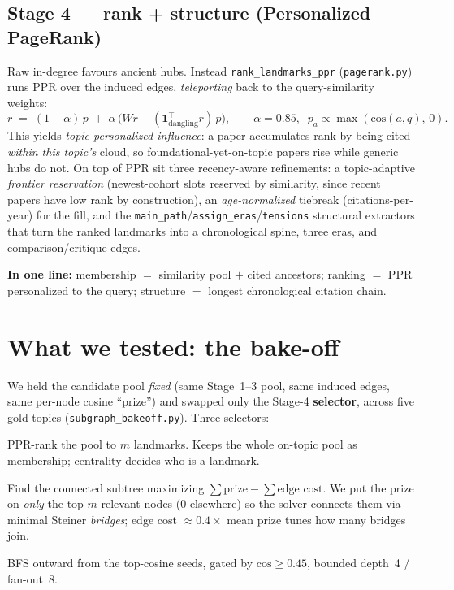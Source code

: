 \documentclass[11pt]{article}
\newcommand{\code}[1]{\texttt{\small #1}}
\newcommand{\arxiv}[1]{\href{https://arxiv.org/abs/#1}{\texttt{#1}}}
\begin{document}
\subsection*{Stage 4 --- rank + structure (Personalized PageRank)}
Raw in-degree favours ancient hubs. Instead \code{rank\_landmarks\_ppr}
(\code{pagerank.py}) runs PPR over the induced edges, \emph{teleporting} back to the
query-similarity weights:
\[
  r \;=\; (1-\alpha)\,p \;+\; \alpha\,\big(W r + (\mathbf{1}^\top_{\text{dangling}} r)\,p\big),
  \qquad \alpha = 0.85,\;\; p_a \propto \max(\text{cos}(a, q),\,0).
\]
This yields \emph{topic-personalized influence}: a paper accumulates rank by being cited
\emph{within this topic's} cloud, so foundational-yet-on-topic papers rise while generic hubs do
not. On top of PPR sit three recency-aware refinements: a topic-adaptive \emph{frontier
reservation} (newest-cohort slots reserved by similarity, since recent papers have low rank by
construction), an \emph{age-normalized} tiebreak (citations-per-year) for the fill, and the
\code{main\_path}/\code{assign\_eras}/\code{tensions} structural extractors that turn the ranked
landmarks into a chronological spine, three eras, and comparison/critique edges.

\medskip\noindent\textbf{In one line:} membership $=$ similarity pool $+$ cited ancestors;
ranking $=$ PPR personalized to the query; structure $=$ longest chronological citation chain.

\section{What we tested: the bake-off}

We held the candidate pool \emph{fixed} (same Stage~1--3 pool, same induced edges, same per-node
cosine ``prize'') and swapped only the Stage-4 \textbf{selector}, across five gold topics
(\code{subgraph\_bakeoff.py}). Three selectors:

\begin{description}[leftmargin=0pt,itemsep=3pt]
  \item[\code{induce} (ours).] PPR-rank the pool to $m$ landmarks. Keeps the whole on-topic pool as
  membership; centrality decides who is a landmark.
  \item[\code{pcst} --- Prize-Collecting Steiner Tree (G-Retriever, \arxiv{2402.07630}).] Find the
  connected subtree maximizing $\sum\text{prize} - \sum\text{edge cost}$. We put the prize on
  \emph{only} the top-$m$ relevant nodes (0 elsewhere) so the solver connects them via minimal
  Steiner \emph{bridges}; edge cost $\approx 0.4\times$ mean prize tunes how many bridges join.
  \item[\code{dsa\_bfs} --- similarity-aware BFS (DynaGRAG, \arxiv{2412.18644}).] BFS outward from
  the top-cosine seeds, gated by $\text{cos}\ge 0.45$, bounded depth~4 / fan-out~8.
\end{description}
\end{document}
